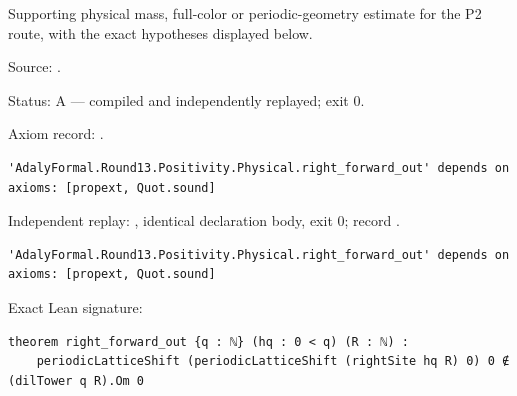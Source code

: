 \begin{theorem}[bp-479]
\label{bp-479}
\uses{}
\leanok
Supporting physical mass, full-color or periodic-geometry estimate for the P2 route, with the exact hypotheses displayed below.

\par Source: \texttt{}.
\par Status: A — compiled and independently replayed; exit 0.
\par Axiom record: \texttt{}.
\begin{verbatim}
'AdalyFormal.Round13.Positivity.Physical.right_forward_out' depends on axioms: [propext, Quot.sound]
\end{verbatim}
\par Independent replay: \texttt{}, identical declaration body, exit 0; record \texttt{}.
\begin{verbatim}
'AdalyFormal.Round13.Positivity.Physical.right_forward_out' depends on axioms: [propext, Quot.sound]
\end{verbatim}
\par Exact Lean signature:
\begin{verbatim}
theorem right_forward_out {q : ℕ} (hq : 0 < q) (R : ℕ) :
    periodicLatticeShift (periodicLatticeShift (rightSite hq R) 0) 0 ∉ (dilTower q R).Om 0
\end{verbatim}
\end{theorem}

